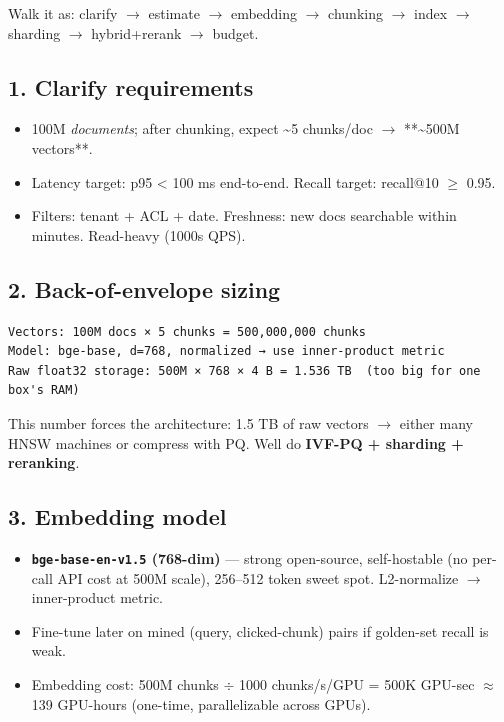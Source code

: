 \documentclass[11pt]{article}
\providecommand{\tightlist}{\setlength{\itemsep}{1pt}\setlength{\parskip}{0pt}}
\begin{document}
Walk it as: clarify \(\rightarrow\) estimate \(\rightarrow\) embedding \(\rightarrow\) chunking \(\rightarrow\) index \(\rightarrow\) sharding \(\rightarrow\) hybrid+rerank \(\rightarrow\) budget.

\subsection{1. Clarify requirements}\label{1-clarify-requirements}

\begin{itemize}
\tightlist
\item
  100M \emph{documents}; after chunking, expect \textasciitilde5 chunks/doc \(\rightarrow\) **\textasciitilde500M vectors**.
\item
  Latency target: p95 \textless{} 100 ms end-to-end. Recall target: recall@10 \(\geq\) 0.95.
\item
  Filters: tenant + ACL + date. Freshness: new docs searchable within minutes. Read-heavy (1000s QPS).
\end{itemize}

\subsection{2. Back-of-envelope sizing}\label{2-back-of-envelope-sizing}

\setcodelang{}

\begin{verbatim}
Vectors: 100M docs × 5 chunks = 500,000,000 chunks
Model: bge-base, d=768, normalized → use inner-product metric
Raw float32 storage: 500M × 768 × 4 B = 1.536 TB  (too big for one box's RAM)
\end{verbatim}

This number forces the architecture: 1.5 TB of raw vectors \(\rightarrow\) either many HNSW machines or compress with PQ. We\textquotesingle ll do \textbf{IVF-PQ + sharding + reranking}.

\subsection{3. Embedding model}\label{3-embedding-model}

\begin{itemize}
\tightlist
\item
  \textbf{\texttt{bge-base-en-v1.5} (768-dim)} --- strong open-source, self-hostable (no per-call API cost at 500M scale), 256--512 token sweet spot. L2-normalize \(\rightarrow\) inner-product metric.
\item
  Fine-tune later on mined (query, clicked-chunk) pairs if golden-set recall is weak.
\item
  Embedding cost: 500M chunks \(\div\) 1000 chunks/s/GPU = 500K GPU-sec \(\approx\) 139 GPU-hours (one-time, parallelizable across GPUs).
\end{itemize}
\end{document}
